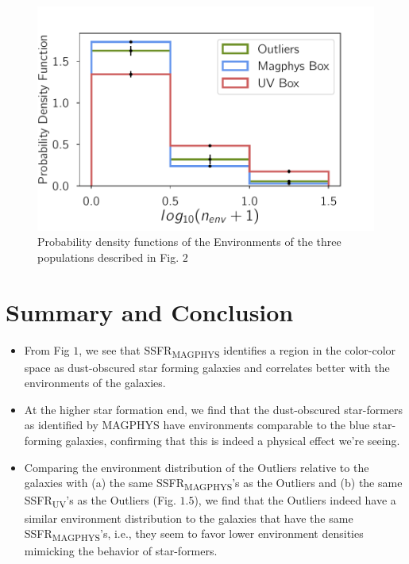\begin{figure}
\includegraphics[width=\textwidth]{figures/4_jk_plot.pdf}
\caption[Environments of the outliers compared to the other populations]
{Probability density functions of the Environments of the three populations described in Fig. $2$
\label{fig:munny_plot}}
\end{figure}

\section{Summary and Conclusion}
 \begin{itemize}
 \item{From Fig $1$, we see that SSFR\textsubscript{MAGPHYS} identifies a region in the color-color space as dust-obscured star forming galaxies and correlates better with the environments of the galaxies.}
 \item{At the higher star formation end, we find that the dust-obscured star-formers as identified by MAGPHYS have environments comparable to the blue star-forming galaxies, confirming that this is indeed a physical effect we're seeing.}
 \item{Comparing the environment distribution of the Outliers relative to the galaxies with (a) the same SSFR\textsubscript{MAGPHYS}'s as the Outliers and (b) the same SSFR\textsubscript{UV}'s as the Outliers (Fig. $1.5$), we find that the Outliers indeed have a similar environment distribution to the galaxies that have the same SSFR\textsubscript{MAGPHYS}'s, i.e., they seem to favor lower environment densities mimicking the behavior of star-formers.}
 \end{itemize}
 
 